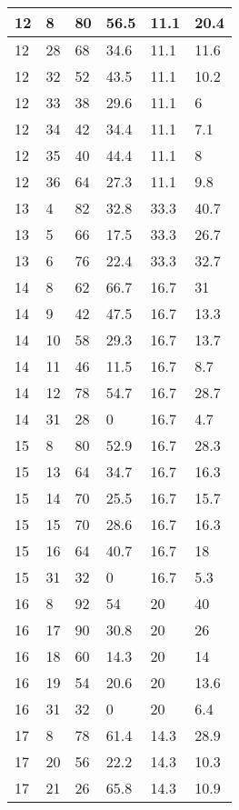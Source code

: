 \begin{longtable}[c]{ | p{2cm} | p{2cm} | p{2cm} | p{2cm} | p{3cm} | p{3cm} | }
	\hline
	12 & 8 & 80 & 56.5 & 11.1 & 20.4 \\
	\hline
	12 & 28 & 68 & 34.6 & 11.1 & 11.6 \\
	\hline
	12 & 32 & 52 & 43.5 & 11.1 & 10.2 \\
	\hline
	12 & 33 & 38 & 29.6 & 11.1 & 6 \\
	\hline
	12 & 34 & 42 & 34.4 & 11.1 & 7.1 \\
	\hline
	12 & 35 & 40 & 44.4 & 11.1 & 8 \\
	\hline
	12 & 36 & 64 & 27.3 & 11.1 & 9.8 \\
	\hline
	\hline
	\hline
	13 & 4 & 82 & 32.8 & 33.3 & 40.7 \\
	\hline
	13 & 5 & 66 & 17.5 & 33.3 & 26.7 \\
	\hline
	13 & 6 & 76 & 22.4 & 33.3 & 32.7 \\
	\hline
	\hline
	\hline
	14 & 8 & 62 & 66.7 & 16.7 & 31 \\
	\hline
	14 & 9 & 42 & 47.5 & 16.7 & 13.3 \\
	\hline
	14 & 10 & 58 & 29.3 & 16.7 & 13.7 \\
	\hline
	14 & 11 & 46 & 11.5 & 16.7 & 8.7 \\
	\hline
	14 & 12 & 78 & 54.7 & 16.7 & 28.7 \\
	\hline
	14 & 31 & 28 & 0 & 16.7 & 4.7 \\
	\hline
	\hline
	\hline
	15 & 8 & 80 & 52.9 & 16.7 & 28.3 \\
	\hline
	15 & 13 & 64 & 34.7 & 16.7 & 16.3 \\
	\hline
	15 & 14 & 70 & 25.5 & 16.7 & 15.7 \\
	\hline
	15 & 15 & 70 & 28.6 & 16.7 & 16.3 \\
	\hline
	15 & 16 & 64 & 40.7 & 16.7 & 18 \\
	\hline
	15 & 31 & 32 & 0 & 16.7 & 5.3 \\
	\hline
	\hline
	\hline
	16 & 8 & 92 & 54 & 20 & 40 \\
	\hline
	16 & 17 & 90 & 30.8 & 20 & 26 \\
	\hline
	16 & 18 & 60 & 14.3 & 20 & 14 \\
	\hline
	16 & 19 & 54 & 20.6 & 20 & 13.6 \\
	\hline
	16 & 31 & 32 & 0 & 20 & 6.4 \\
	\hline
	\hline
	\hline
	17 & 8 & 78 & 61.4 & 14.3 & 28.9 \\
	\hline
	17 & 20 & 56 & 22.2 & 14.3 & 10.3 \\
	\hline
	17 & 21 & 26 & 65.8 & 14.3 & 10.9 \\

\end{longtable}
